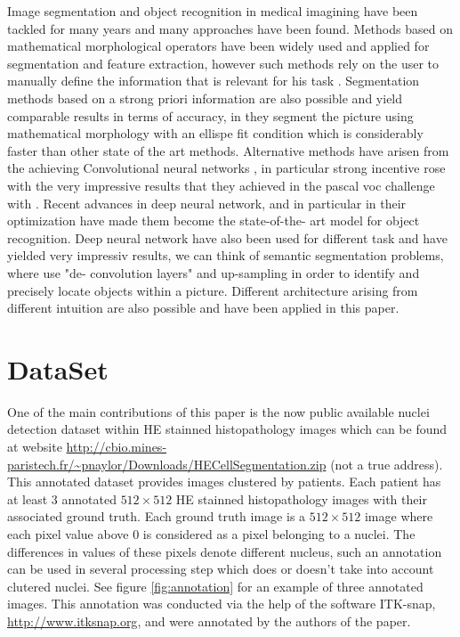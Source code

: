 \documentclass{article}
\begin{document}
Image segmentation and object recognition in medical imagining have 
been tackled for many years and many approaches have been found. 
Methods based on mathematical morphological operators have been 
widely used and applied for segmentation and feature extraction, 
however such methods rely on the user to manually define the 
information that is relevant for his task \cite{irshad2014methods}. 
Segmentation methods based on a strong priori information are also 
possible and yield comparable results in terms of accuracy, in 
\cite{ranefall2016fast} they segment the picture using mathematical 
morphology with an ellispe fit condition 
which is considerably faster than other state of the art methods. 
Alternative methods 
have arisen from the achieving Convolutional neural networks 
\cite{lecun}, in particular strong incentive rose with the very impressive 
results that they achieved in the pascal voc challenge with 
\cite{ImageNet}. Recent advances in deep neural network, and in 
particular in their optimization have made them become the state-of-the-
art model for object recognition.  Deep neural network have also been 
used for different task and have yielded very impressiv results, we can think of 
semantic segmentation problems, where \cite{long2015fcn} use "de-
convolution layers" and up-sampling in order to identify and precisely 
locate objects within a picture. Different architecture arising from 
different intuition are also possible and have been applied in this paper.



\section{DataSet}
\label{sec:dataset}

\noindent One of the main contributions of this paper is the now public available 
nuclei detection dataset within HE stainned histopathology images which 
can be found at website \url{http://cbio.mines-paristech.fr/~pnaylor/Downloads/HECellSegmentation.zip} 
(not a true address). This annotated dataset provides images clustered by 
patients. Each patient has at least 3 annotated $512 \times 512$ HE 
stainned histopathology images with their associated ground truth. Each 
ground truth image is a $512 \times 512$ image where each pixel value above 
$0$ is considered as a pixel belonging to a nuclei. The differences in 
values of these pixels denote different nucleus, such an annotation can 
be used in several processing step which does or doesn't take into 
account clutered nuclei. See figure \ref{fig:annotation} for an example of 
three annotated images. This annotation was conducted via the help of 
the software ITK-snap, \cite{py06nimg} \url{http://www.itksnap.org}, and were annotated by the authors of the paper.
\end{document}
